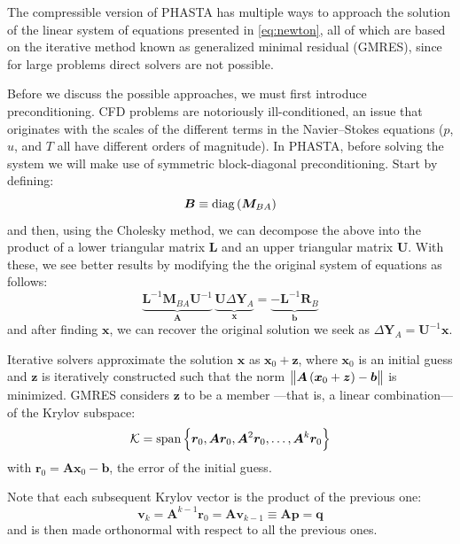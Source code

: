 \documentclass{ucb}
\begin{document}
The compressible version of PHASTA has multiple ways to approach the solution of the linear system of equations presented in \autoref{eq:newton}, all of which are based on the iterative method known as generalized minimal residual (GMRES), since for large problems direct solvers are not possible.

Before we discuss the possible approaches, we must first introduce preconditioning. CFD problems are notoriously ill-conditioned, an issue that originates with the scales of the different terms in the Navier--Stokes equations ($p$, $u$, and $T$ all have different orders of magnitude). In PHASTA, before solving the system we will make use of symmetric block-diagonal preconditioning. Start by defining:
\begin{equation}
    \bm{B} \equiv \operatorname{diag}\left(\bm{M}_{BA}\right)
\end{equation}
and then, using the Cholesky method, we can decompose the above into the product of a lower triangular matrix $\bm{L}$ and an upper triangular matrix $\bm{U}$. With these, we see better results by modifying the the original system of equations as follows:
\begin{equation}
    \underbrace{\bm{L}^{-1} \bm{M}_{BA} \bm{U}^{-1}}_{\bm{A}} \, \underbrace{\bm{U} \Delta\bm{Y}_A}_{\bm{x}} = \underbrace{-\bm{L}^{-1}\bm{R}_B}_{\bm{b}}
\end{equation}
and after finding $\bm{x}$, we can recover the original solution we seek as $\Delta\bm{Y}_A = \bm{U}^{-1}\bm{x}$.

Iterative solvers approximate the solution $\bm{x}$ as $\bm{x}_0 + \bm{z}$, where $\bm{x}_0$ is an initial guess and $\bm{z}$ is iteratively constructed such that the norm $\norm{\bm{A}\left(\bm{x}_0 + \bm{z}\right) - \bm{b}}$ is minimized. GMRES considers $\bm{z}$ to be a member ---that is, a linear combination--- of the Krylov subspace:
\begin{equation}
    \mathcal{K} = \operatorname{span}\left\{\bm{r}_0, \bm{A}\bm{r}_0, \bm{A}^2\bm{r}_0, \ldots, \bm{A}^k\bm{r}_0\right\}
\end{equation}
with $\bm{r}_0 = \bm{A}\bm{x}_0 - \bm{b}$, the error of the initial guess.

Note that each subsequent Krylov vector is the product of the previous one:
\begin{equation}
    \bm{v}_k = \bm{A}^{k-1}\bm{r}_0 = \bm{A}\bm{v}_{k-1} \equiv \bm{A}\bm{p} = \bm{q}
\end{equation}
and is then made orthonormal with respect to all the previous ones.
\end{document}

